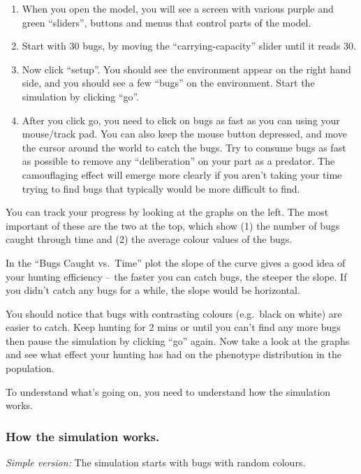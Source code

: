 \documentclass[
  a4paper]{book}
\providecommand{\tightlist}{%
  \setlength{\itemsep}{0pt}\setlength{\parskip}{0pt}}
\begin{document}
\begin{enumerate}
\def\labelenumi{\arabic{enumi}.}
\tightlist
\item
  When you open the model, you will see a screen with various purple and green ``sliders'', buttons and menus that control parts of the model.
\item
  Start with 30 bugs, by moving the ``carrying-capacity'' slider until it reads 30.
\item
  Now click ``setup''. You should see the environment appear on the right hand side, and you should see a few ``bugs'' on the environment. Start the simulation by clicking ``go''.
\item
  After you click go, you need to click on bugs as fast as you can using your mouse/track pad. You can also keep the mouse button depressed, and move the cursor around the world to catch the bugs. Try to consume bugs as fast as possible to remove any ``deliberation'' on your part as a predator. The camouflaging effect will emerge more clearly if you aren't taking your time trying to find bugs that typically would be more difficult to find.
\end{enumerate}

You can track your progress by looking at the graphs on the left. The most important of these are the two at the top, which show (1) the number of bugs caught through time and (2) the average colour values of the bugs.

In the ``Bugs Caught vs.~Time'' plot the slope of the curve gives a good idea of your hunting efficiency -- the faster you can catch bugs, the steeper the slope. If you didn't catch any bugs for a while, the slope would be horizontal.

You should notice that bugs with contrasting colours (e.g.~black on white) are easier to catch. Keep hunting for 2 mins or until you can't find any more bugs then pause the simulation by clicking ``go'' again. Now take a look at the graphs and see what effect your hunting has had on the phenotype distribution in the population.

To understand what's going on, you need to understand how the simulation works.

\subsubsection{How the simulation works.}\label{how-the-simulation-works.-1}

\emph{Simple version:}
The simulation starts with bugs with random colours.
\end{document}
